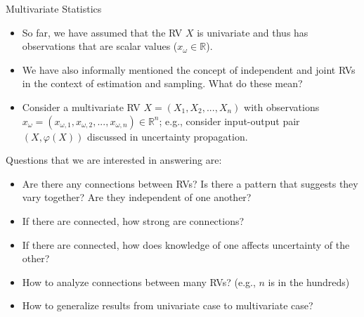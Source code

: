 \documentclass[9pt]{beamer}
\begin{document}
%
\begin{frame}{Multivariate Statistics}

\begin{itemize}
\item So far, we have assumed that the RV $X$ is univariate and thus has observations that are scalar values ($x_\omega \in \mathbb{R}$).  

\item We have also informally mentioned the concept of independent and joint RVs in the context of estimation and sampling.  What do these mean?

\item Consider a multivariate RV $X=(X_1,X_2,...,X_n)$ with observations $x_\omega=(x_{\omega,1},x_{\omega,2},...,x_{\omega,n})\in \mathbb{R}^n$; e.g., consider input-output pair $(X,\varphi(X))$ discussed in uncertainty propagation.
 
\end{itemize}

Questions that we are interested in answering are:
\begin{block}{}
\begin{itemize}
\item Are there any connections between RVs? Is there a pattern that suggests they vary together? Are they independent of one another?
\item If there are connected, how strong are connections?
\item If there are connected, how does knowledge of one affects uncertainty of the other? 
\item How to analyze connections between many RVs? (e.g., $n$ is in the hundreds)
\item How to generalize results from univariate case to multivariate case? 
\end{itemize}
\end{block}

\end{frame}
\end{document}
